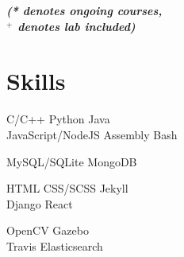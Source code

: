 \documentclass[a4paper, 10pt]{deedy-resume} %
\begin{document}
\begin{minipage}[t]{0.30\textwidth}
  {\footnotesize \textit{\textbf{(* denotes ongoing courses, \\ $^+$ denotes lab included) }}} \\

  \sectionspace

  \section{Skills}

  \runsubsection{}
  C/C++ \textbullet{} Python \textbullet{} Java \\
  \textbullet{} JavaScript/NodeJS \textbullet{} Assembly \textbullet{} Bash

  \sectionspace
  \sectionspace

  MySQL/SQLite \textbullet{} MongoDB
  \sectionspace
  \sectionspace

  HTML \textbullet{} CSS/SCSS \textbullet{} Jekyll \\
  \textbullet{} Django \textbullet{} React
  \sectionspace
  \sectionspace
  
  \textbullet{} OpenCV \textbullet{} Gazebo \\
  \textbullet{} Travis \textbullet{} Elasticsearch \\

  \sectionspace  
\end{minipage}
\hfill
\begin{minipage}[t]{0.03\textwidth} %
\end{minipage}
\hfill
\end{document}

